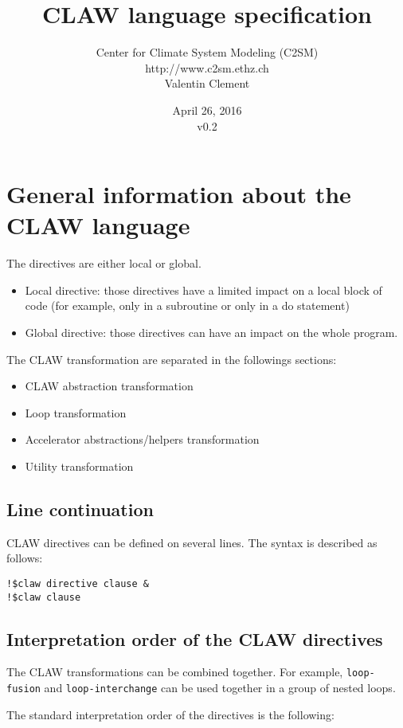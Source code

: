 \documentclass{article}
\title{CLAW language specification}
\author{Center for Climate System Modeling (C2SM)\\http://www.c2sm.ethz.ch\\Valentin Clement}
\date{April 26, 2016\\\vspace{1em}v0.2}
\begin{document}
\maketitle


\tableofcontents

\section{General information about the CLAW language}
The directives are either local or global.

\begin{itemize}
\item Local directive: those directives have a limited impact on a local block of
code (for example, only in a subroutine or only in a do statement)
\item Global directive: those directives can have an impact on the whole
program.
\end{itemize}

The CLAW transformation are separated in the followings sections:
\begin{itemize}
\item CLAW abstraction transformation
\item Loop transformation
\item Accelerator abstractions/helpers transformation
\item Utility transformation
\end{itemize}

\subsection{Line continuation}
CLAW directives can be defined on several lines. The syntax is described as follows:

\begin{lstlisting}
!$claw directive clause &
!$claw clause
\end{lstlisting}


\subsection{Interpretation order of the CLAW directives}
The CLAW transformations can be combined together. For example, \lstinline!loop-fusion! and \lstinline!loop-interchange! can be used together in a group of nested loops.

The standard interpretation order of the directives is the following:
\end{document}
